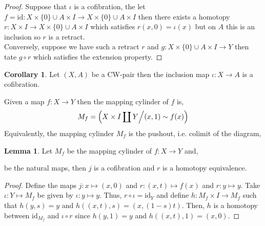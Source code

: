 \documentclass[12pt]{extarticle}
\newcommand{\id}{\mathrm{id}}
\theoremstyle{definition}
\newtheorem{lemma}[theorem]{Lemma}
\newtheorem{corollary}[theorem]{Corollary}
\newenvironment{definition}[1][Definition:]{\begin{trivlist}
\item[\hskip \labelsep {\bfseries #1}]}{\end{trivlist}}
\begin{document}
\begin{proof}
Suppose that $\iota$ is a cofibration, the let $f = \id : X \times \{0\} \cup A \times I \to  X \times \{0\} \cup A \times I$ then there exists a homotopy $r : X \times I \to X \times \{0\} \cup A \times I$ which satisfies $r(x, 0) = \iota(x)$ but on $A$ this is an inclusion so $r$ is a retract. \bigskip \\
Conversely, suppose we have such a retract $r$ and $g :  X \times \{0\} \cup A \times I \to Y$ then tate $ g \circ r$ which satisfies the extension property.  
\end{proof}

\begin{corollary}
Let $(X, A)$ be a CW-pair then the inclusion map $\iota : X \to A$ is a cofibration. 
\end{corollary}

\begin{definition}
Given a map $f : X \to Y$ then the mapping cylinder of $f$ is, 
\[M_f = \left(X \times I \coprod Y \middle/ (x, 1) \sim f(x) \right)\] 
Equivalently, the mapping cylinder $M_f$ is the pushout, i.e. colimit of the diagram,
\begin{center}
\end{center}
\end{definition}

\begin{lemma}
Let $M_f$ be the mapping cylinder of $f : X \to Y$ and,
\begin{center}
\end{center}
be the natural maps, then $j$ is a cofibration and $r$ is a homotopy equivalence.
\end{lemma}

\begin{proof}
Define the maps $j : x \mapsto (x, 0)$ and $r : (x, t) \mapsto f(x)$ and $r : y \mapsto y$. Take $\iota : Y \mapsto M_f$ be given by $\iota : y \mapsto y$. Thus, $r \circ \iota = \id_{Y}$ and define $h : M_f \times I \to M_f$ such that $h(y, s) = y$ and $h((x, t), s) = (x, (1 - s)t )$. Then, $h$ is a homotopy between $\id_{M_f}$ and $\iota \circ r$ since $h(y, 1) = y$ and $h((x, t), 1) = (x, 0)$.  
\end{proof}
\end{document}
